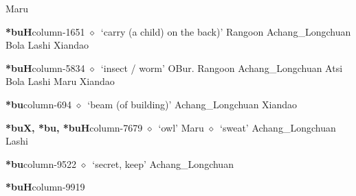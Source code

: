          Maru 
  \item {\footnotesize \textbf{*buH}}{\tiny column-1651}
         $\diamond$~`carry (a child) on the back)'
         Rangoon 
\hspace{1ex}
         Achang\_Longchuan 
\hspace{1ex}
         Bola 
\hspace{1ex}
         Lashi 
\hspace{1ex}
         Xiandao 
  \item {\footnotesize \textbf{*buH}}{\tiny column-5834}
         $\diamond$~`insect / worm'
         OBur. 
\hspace{1ex}
         Rangoon 
\hspace{1ex}
         Achang\_Longchuan 
\hspace{1ex}
         Atsi 
\hspace{1ex}
         Bola 
\hspace{1ex}
         Lashi 
\hspace{1ex}
         Maru 
\hspace{1ex}
         Xiandao 
  \item {\footnotesize \textbf{*bu}}{\tiny column-694}
         $\diamond$~`beam (of building)'
         Achang\_Longchuan 
\hspace{1ex}
         Xiandao 
  \item {\footnotesize \textbf{*buX, *bu, *buH}}{\tiny column-7679}
         $\diamond$~`owl'
         Maru 
\hspace{1ex}
         $\diamond$~`sweat'
         Achang\_Longchuan 
\hspace{1ex}
         Lashi 
  \item {\footnotesize \textbf{*bu}}{\tiny column-9522}
         $\diamond$~`secret, keep'
         Achang\_Longchuan 
  \item {\footnotesize \textbf{*buH}}{\tiny column-9919}
